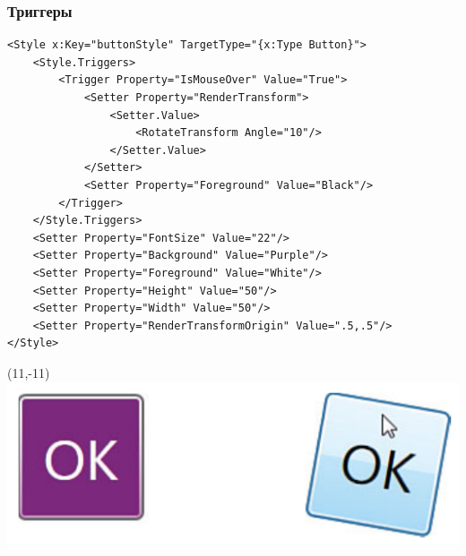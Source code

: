 \documentclass[xetex,mathserif,serif]{beamer}
\begin{document}
	\begin{frame}[fragile]
		\frametitle{Триггеры}
		\begin{scriptsize}
			\begin{verbatim}
<Style x:Key="buttonStyle" TargetType="{x:Type Button}">
    <Style.Triggers>
        <Trigger Property="IsMouseOver" Value="True">
            <Setter Property="RenderTransform">
                <Setter.Value>
                    <RotateTransform Angle="10"/>
                </Setter.Value>
            </Setter>
            <Setter Property="Foreground" Value="Black"/>
        </Trigger>
    </Style.Triggers>
    <Setter Property="FontSize" Value="22"/>
    <Setter Property="Background" Value="Purple"/>
    <Setter Property="Foreground" Value="White"/>
    <Setter Property="Height" Value="50"/>
    <Setter Property="Width" Value="50"/>
    <Setter Property="RenderTransformOrigin" Value=".5,.5"/>
</Style>
			\end{verbatim}
		\end{scriptsize}
		\begin{textblock}{3}(11,-11)
			\includegraphics[width=\textwidth]{triggeredButtons.png}
		\end{textblock}
	\end{frame}
\end{document}
